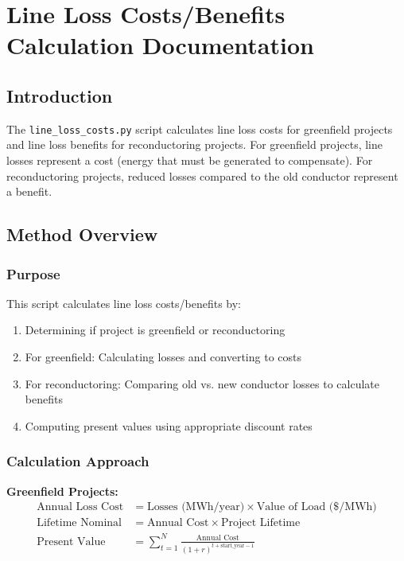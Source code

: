 \documentclass[ctcc_full_documentation.tex]{subfiles}
\begin{document}
\chapter{Line Loss Costs/Benefits Calculation Documentation}

\section{Introduction}

The \texttt{line\_loss\_costs.py} script calculates line loss costs for greenfield projects and line loss benefits for reconductoring projects. For greenfield projects, line losses represent a cost (energy that must be generated to compensate). For reconductoring projects, reduced losses compared to the old conductor represent a benefit.

\section{Method Overview}

\subsection{Purpose}

This script calculates line loss costs/benefits by:
\begin{enumerate}
    \item Determining if project is greenfield or reconductoring
    \item For greenfield: Calculating losses and converting to costs
    \item For reconductoring: Comparing old vs. new conductor losses to calculate benefits
    \item Computing present values using appropriate discount rates
\end{enumerate}

\subsection{Calculation Approach}

\textbf{Greenfield Projects:}
\begin{align}
\text{Annual Loss Cost} &= \text{Losses (MWh/year)} \times \text{Value of Load (\$/MWh)} \\
\text{Lifetime Nominal} &= \text{Annual Cost} \times \text{Project Lifetime} \\
\text{Present Value} &= \sum_{t=1}^{N} \frac{\text{Annual Cost}}{(1 + r)^{t + \text{start\_year} - 1}}
\end{align}
\end{document}
